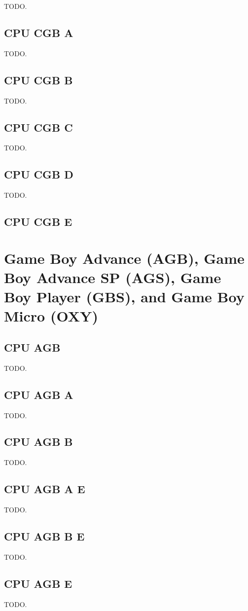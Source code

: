 TODO.

\subsection{CPU CGB A}

TODO.

\subsection{CPU CGB B}

TODO.

\subsection{CPU CGB C}

TODO.

\subsection{CPU CGB D}

TODO.

\subsection{CPU CGB E}

\section{Game Boy Advance (AGB), Game Boy Advance SP (AGS), Game Boy Player (GBS), and Game Boy Micro (OXY)}

\subsection{CPU AGB}

TODO.

\subsection{CPU AGB A}

TODO.

\subsection{CPU AGB B}

TODO.

\subsection{CPU AGB A E}

TODO.

\subsection{CPU AGB B E}

TODO.

\subsection{CPU AGB E}

TODO.
